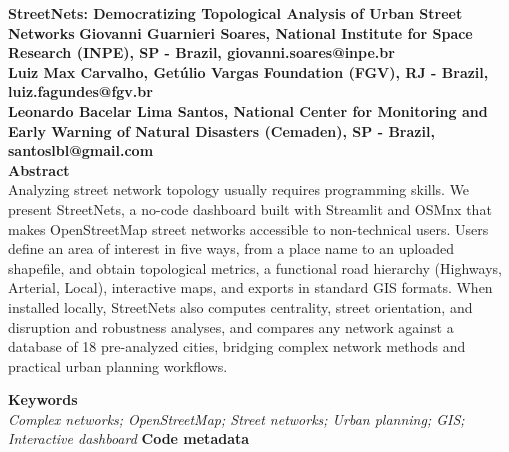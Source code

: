 \documentclass[11pt, letterpaper]{article}
\begin{document}
\noindent
\textbf{StreetNets: Democratizing Topological Analysis of Urban Street Networks}
\vskip0.5cm
\noindent
\textbf{Giovanni Guarnieri Soares, National Institute for Space Research (INPE), SP - Brazil, giovanni.soares@inpe.br\\
Luiz Max Carvalho, Getúlio Vargas Foundation (FGV), RJ - Brazil, luiz.fagundes@fgv.br\\
Leonardo Bacelar Lima Santos, National Center for Monitoring and Early Warning of Natural Disasters (Cemaden), SP - Brazil, santoslbl@gmail.com
}\\

\noindent
\textbf{Abstract}\\
Analyzing street network topology usually requires programming skills. We present StreetNets, a no-code dashboard built with Streamlit and OSMnx that makes OpenStreetMap street networks accessible to non-technical users. Users define an area of interest in five ways, from a place name to an uploaded shapefile, and obtain topological metrics, a functional road hierarchy (Highways, Arterial, Local), interactive maps, and exports in standard GIS formats. When installed locally, StreetNets also computes centrality, street orientation, and disruption and robustness analyses, and compares any network against a database of 18 pre-analyzed cities, bridging complex network methods and practical urban planning workflows.
\vskip0.5cm

\noindent
\textbf{Keywords}\\
\textit{Complex networks; OpenStreetMap; Street networks; Urban planning; GIS; Interactive dashboard}
\vskip0.5cm
\newpage
\noindent
\textbf{Code metadata}\\
\end{document}
